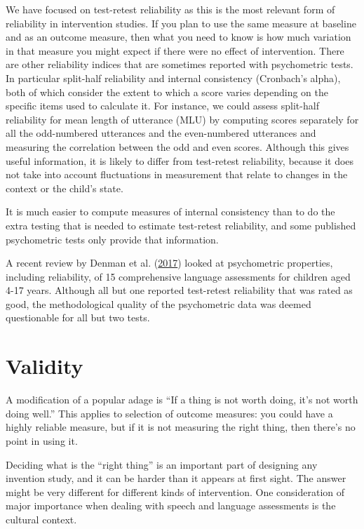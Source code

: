 \documentclass{krantz}
\begin{document}
We have focused on test-retest reliability as this is the most relevant form of reliability in intervention studies. If you plan to use the same measure at baseline and as an outcome measure, then what you need to know is how much variation in that measure you might expect if there were no effect of intervention. There are other reliability indices that are sometimes reported with psychometric tests. In particular split-half reliability and internal consistency (Cronbach's alpha), both of which consider the extent to which a score varies depending on the specific items used to calculate it. For instance, we could assess split-half reliability for mean length of utterance (MLU) by computing scores separately for all the odd-numbered utterances and the even-numbered utterances and measuring the correlation between the odd and even scores. Although this gives useful information, it is likely to differ from test-retest reliability, because it does not take into account fluctuations in measurement that relate to changes in the context or the child's state.

It is much easier to compute measures of internal consistency than to do the extra testing that is needed to estimate test-retest reliability, and some published psychometric tests only provide that information.

A recent review by Denman et al. (\protect\hyperlink{ref-denman2017}{2017}) looked at psychometric properties, including reliability, of 15 comprehensive language assessments for children aged 4-17 years. Although all but one reported test-retest reliability that was rated as good, the methodological quality of the psychometric data was deemed questionable for all but two tests.

\hypertarget{validity}{%
\section{Validity}\label{validity}}

A modification of a popular adage is ``If a thing is not worth doing, it's not worth doing well.'' This applies to selection of outcome measures: you could have a highly reliable measure, but if it is not measuring the right thing, then there's no point in using it.

Deciding what is the ``right thing'' is an important part of designing any invention study, and it can be harder than it appears at first sight. The answer might be very different for different kinds of intervention. One consideration of major importance when dealing with speech and language assessments is the cultural context.
\end{document}
